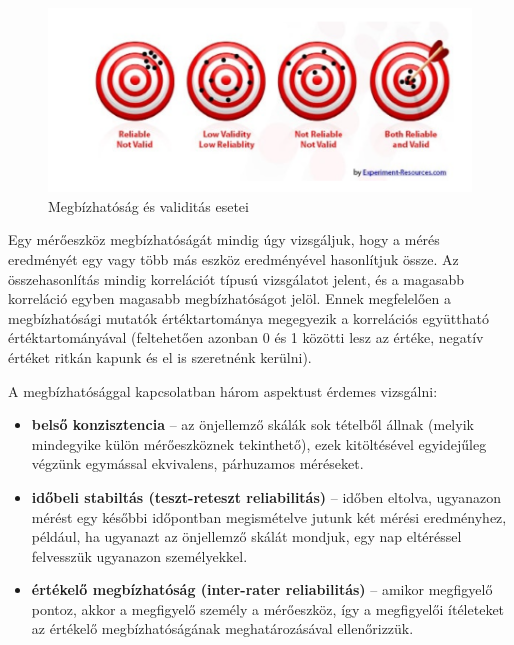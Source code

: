 \documentclass[
  letterpaper,
]{krantz}
\providecommand{\tightlist}{%
  \setlength{\itemsep}{0pt}\setlength{\parskip}{0pt}}\usepackage{longtable,booktabs,array}
\begin{document}
\begin{figure}

{\centering \includegraphics{./images/megbizhatosag_kep_01.png}

}

\caption{Megbízhatóság és validitás esetei}

\end{figure}

Egy mérőeszköz megbízhatóságát mindig úgy vizsgáljuk, hogy a mérés
eredményét egy vagy több más eszköz eredményével hasonlítjuk össze. Az
összehasonlítás mindig korrelációt típusú vizsgálatot jelent, és a
magasabb korreláció egyben magasabb megbízhatóságot jelöl. Ennek
megfelelően a megbízhatósági mutatók értéktartománya megegyezik a
korrelációs együttható értéktartományával (feltehetően azonban 0 és 1
közötti lesz az értéke, negatív értéket ritkán kapunk és el is
szeretnénk kerülni).

A megbízhatósággal kapcsolatban három aspektust érdemes vizsgálni:

\begin{itemize}
\tightlist
\item
  \textbf{belső konzisztencia} -- az önjellemző skálák sok tételből
  állnak (melyik mindegyike külön mérőeszköznek tekinthető), ezek
  kitöltésével egyidejűleg végzünk egymással ekvivalens, párhuzamos
  méréseket.
\item
  \textbf{időbeli stabiltás (teszt-reteszt reliabilitás)} -- időben
  eltolva, ugyanazon mérést egy későbbi időpontban megismételve jutunk
  két mérési eredményhez, például, ha ugyanazt az önjellemző skálát
  mondjuk, egy nap eltéréssel felvesszük ugyanazon személyekkel.
\item
  \textbf{értékelő megbízhatóság (inter-rater reliabilitás)} -- amikor
  megfigyelő pontoz, akkor a megfigyelő személy a mérőeszköz, így a
  megfigyelői ítéleteket az értékelő megbízhatóságának meghatározásával
  ellenőrizzük.
\end{itemize}
\end{document}
